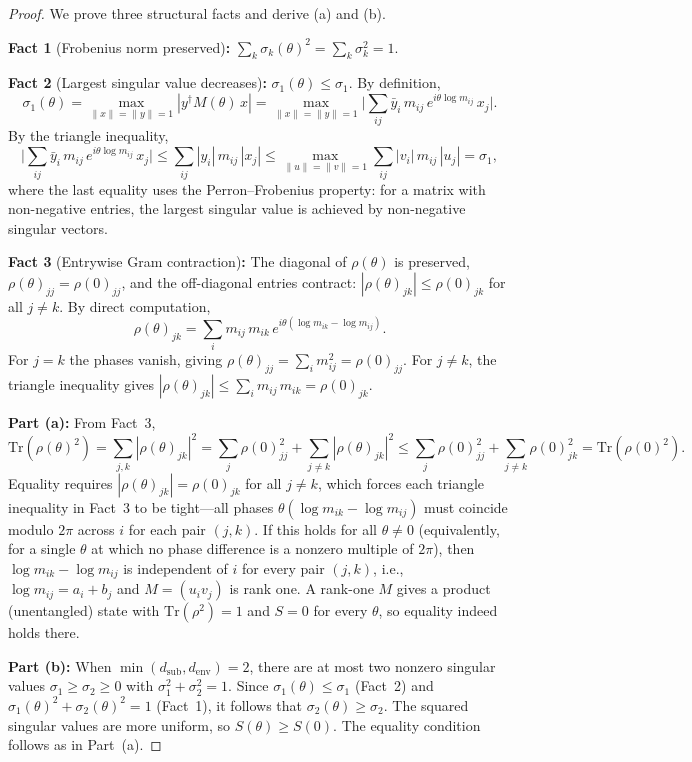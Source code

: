 \documentclass[12pt,a4paper]{article}
\theoremstyle{definition}
\theoremstyle{remark}
\begin{document}
\begin{proof}
We prove three structural facts and derive (a) and (b).

\textbf{Fact 1} (Frobenius norm preserved)\textbf{:} $\sum_k
\sigma_k(\theta)^2 = \sum_k \sigma_k^2 = 1$.

\textbf{Fact 2} (Largest singular value decreases)\textbf{:}
$\sigma_1(\theta) \leq \sigma_1$. By definition,
\[
  \sigma_1(\theta) = \max_{\|x\| = \|y\| = 1} |y^\dagger M(\theta)\, x|
  = \max_{\|x\| = \|y\| = 1} \Big|\sum_{ij} \bar{y}_i\, m_{ij}\,
  e^{i\theta \log m_{ij}}\, x_j \Big|.
\]
By the triangle inequality,
\[
  \Big|\sum_{ij} \bar{y}_i\, m_{ij}\, e^{i\theta \log m_{ij}}\, x_j
  \Big| \leq \sum_{ij} |y_i|\, m_{ij}\, |x_j|
  \leq \max_{\|u\| = \|v\| = 1} \sum_{ij} |v_i|\, m_{ij}\, |u_j|
  = \sigma_1,
\]
where the last equality uses the Perron--Frobenius property: for a
matrix with non-negative entries, the largest singular value is achieved
by non-negative singular vectors.

\textbf{Fact 3} (Entrywise Gram contraction)\textbf{:} The diagonal of
$\rho(\theta)$ is preserved, $\rho(\theta)_{jj} = \rho(0)_{jj}$, and
the off-diagonal entries contract: $|\rho(\theta)_{jk}| \leq
\rho(0)_{jk}$ for all $j \neq k$. By direct computation,
\[
  \rho(\theta)_{jk} = \sum_i m_{ij}\, m_{ik}\,
  e^{i\theta(\log m_{ik} - \log m_{ij})}.
\]
For $j = k$ the phases vanish, giving $\rho(\theta)_{jj} = \sum_i
m_{ij}^2 = \rho(0)_{jj}$. For $j \neq k$, the triangle inequality
gives $|\rho(\theta)_{jk}| \leq \sum_i m_{ij}\, m_{ik} =
\rho(0)_{jk}$.

\textbf{Part (a):} From Fact~3,
\[
  \mathrm{Tr}(\rho(\theta)^2) = \sum_{j,k} |\rho(\theta)_{jk}|^2
  = \sum_j \rho(0)_{jj}^2 + \sum_{j \neq k} |\rho(\theta)_{jk}|^2
  \leq \sum_j \rho(0)_{jj}^2 + \sum_{j \neq k} \rho(0)_{jk}^2
  = \mathrm{Tr}(\rho(0)^2).
\]
Equality requires $|\rho(\theta)_{jk}| = \rho(0)_{jk}$ for all
$j \neq k$, which forces each triangle inequality in Fact~3 to be
tight---all phases $\theta(\log m_{ik} - \log m_{ij})$ must coincide
modulo $2\pi$ across $i$ for each pair $(j,k)$. If this holds for all
$\theta \neq 0$ (equivalently, for a single $\theta$ at which no phase
difference is a nonzero multiple of $2\pi$), then $\log m_{ik} - \log
m_{ij}$ is independent of $i$ for every pair $(j,k)$, i.e., $\log
m_{ij} = a_i + b_j$ and $M = (u_i v_j)$ is rank one. A rank-one $M$
gives a product (unentangled) state with $\mathrm{Tr}(\rho^2) = 1$ and
$S = 0$ for every $\theta$, so equality indeed holds there.

\textbf{Part (b):} When $\min(d_{\mathrm{sub}}, d_{\mathrm{env}}) =
2$, there are at most two nonzero singular values $\sigma_1 \geq
\sigma_2 \geq 0$ with $\sigma_1^2 + \sigma_2^2 = 1$. Since
$\sigma_1(\theta) \leq \sigma_1$ (Fact~2) and $\sigma_1(\theta)^2 +
\sigma_2(\theta)^2 = 1$ (Fact~1), it follows that $\sigma_2(\theta)
\geq \sigma_2$. The squared singular values are more uniform, so
$S(\theta) \geq S(0)$. The equality condition follows as in Part~(a).
\end{proof}
\end{document}
